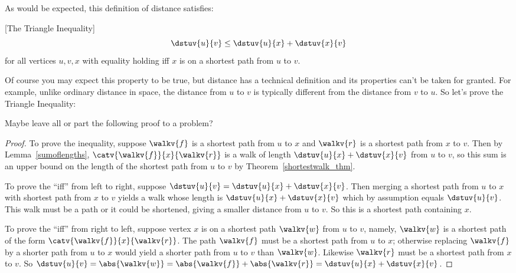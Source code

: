 As would be expected, this definition of distance satisfies:
\begin{lemma}\label{lem:tri-ineq} [The Triangle Inequality]
\[
\dstuv{u}{v} \leq \dstuv{u}{x} + \dstuv{x}{v}
\]
for all vertices $u,v,x$ with equality holding iff $x$ is on a shortest
path from $u$ to $v$.
\end{lemma}
Of course you may expect this property to be true, but distance has a
technical definition and its properties can't be taken for granted.
For example, unlike ordinary distance in space, the distance from $u$
to $v$ is typically different from the distance from $v$ to $u$.
So let's prove the Triangle Inequality:

\begin{editingnotes}
  Maybe leave all or part the following proof to a problem?
\end{editingnotes}

\begin{proof}
  To prove the inequality, suppose $\walkv{f}$ is a shortest path from
  $u$ to $x$ and $\walkv{r}$ is a shortest path from $x$ to $v$.  Then
  by Lemma~\ref{sumoflengths}, $\catv{\walkv{f}}{x}{\walkv{r}}$ is a
  walk of length $\dstuv{u}{x} + \dstuv{x}{v}$ from $u$ to $v$, so
  this sum is an upper bound on the length of the shortest path from
  $u$ to $v$ by Theorem~\ref{shortestwalk_thm}.

  To prove the ``iff'' from left to right, suppose $\dstuv{u}{v} =
  \dstuv{u}{x} + \dstuv{x}{v}$.  Then merging a shortest path from $u$
  to $x$ with shortest path from $x$ to $v$ yields a walk whose length
  is $\dstuv{u}{x} + \dstuv{x}{v}$ which by assumption equals
  $\dstuv{u}{v}$.  This walk must be a path or it could be shortened,
  giving a smaller distance from $u$ to $v$.  So this is a shortest
  path containing $x$.

  To prove the ``iff'' from right to left, suppose vertex $x$ is on a
  shortest path $\walkv{w}$ from $u$ to $v$, namely, $\walkv{w}$ is a
  shortest path of the form $\catv{\walkv{f}}{x}{\walkv{r}}$.  The
  path $\walkv{f}$ must be a shortest path from $u$ to $x$; otherwise
  replacing $\walkv{f}$ by a shorter path from $u$ to $x$ would yield
  a shorter path from $u$ to $v$ than $\walkv{w}$.  Likewise
  $\walkv{r}$ must be a shortest path from $x$ to $v$.  So
  $\dstuv{u}{v} = \abs{\walkv{w}} = \abs{\walkv{f}} + \abs{\walkv{r}}
  = \dstuv{u}{x} + \dstuv{x}{v}$.
  
\end{proof}

